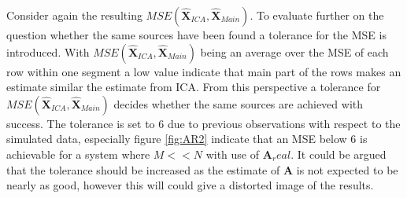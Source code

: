 Consider again the resulting $MSE(\hat{\textbf{X}}_{ICA},\hat{\textbf{X}}_{Main})$. 
To evaluate further on the question whether the same sources have been found a tolerance for the MSE is introduced. 
With $MSE(\hat{\textbf{X}}_{ICA},\hat{\textbf{X}}_{Main})$ being an average over the MSE of each row within one segment a low value indicate that main part of the rows makes an estimate similar the estimate from ICA. 
From this perspective a tolerance for $MSE(\hat{\textbf{X}}_{ICA},\hat{\textbf{X}}_{Main})$ decides whether the same sources are achieved with success. 
The tolerance is set to 6 due to previous observations with respect to the simulated data, especially figure \ref{fig:AR2} indicate that an MSE below 6 is achievable for a system where $M<<N$ with use of $\textbf{A}_real$. 
It could be argued that the tolerance should be increased as the estimate of $\textbf{A}$ is not expected to be nearly as good, however this will could give a distorted image of the results.          

